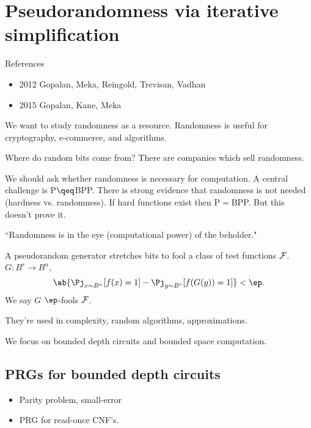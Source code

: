 \def\filepath{C:/Users/Owner/Dropbox/Math/templates}






\pagestyle{fancy}
\chead{} 
\rhead{} 
\lfoot{} 
\cfoot{\thepage} 
\rfoot{} 
\renewcommand{\headrulewidth}{.3pt} 
\setlength\voffset{0in}
\setlength\textheight{648pt}




\section{Pseudorandomness via iterative simplification}

References
\begin{itemize}
\item
2012 Gopalan, Meka, Reingold, Trevisan, Vadhan
\item
2015 Gopalan, Kane, Meka
\end{itemize}

We want to study randomness as a resource. Randomness is useful for cryptography, e-commerce, and algorithms.

Where do random bits come from? There are companies which sell randomness. 

We should ask whether randomness is necessary for computation. A central challenge is P$\qeq$BPP. There is strong evidence that randomness is not needed (hardness vs. randomness). If hard functions exist then P$=$BPP. But this doesn't prove it.

``Randomness is in the eye (computational power) of the beholder."

A pseudorandom generator stretches bits to fool a class of test functions $\cal F$. $G:B^r\to B^n$, \[\ab{\Pj_{x\sim B^n}[f(x)=1]-\Pj_{y\sim B^r}[f(G(y))=1]}<\ep.\]
We say $G$ $\ep$-fools $\cal F$.

They're used in complexity, random algorithms, approximations.

We focus on bounded depth circuits and bounded space computation. 

\subsection{PRGs for bounded depth circuits}
\begin{itemize}
\item
Parity problem, small-error
\item
PRG for read-once CNF's.
\end{itemize}

